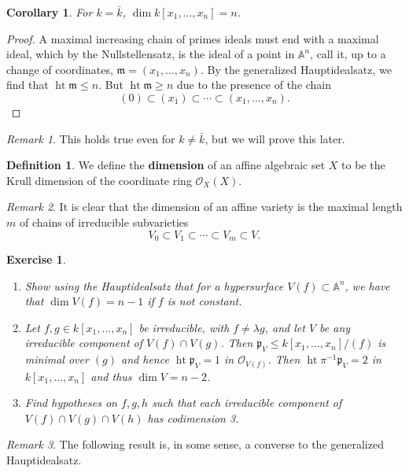 \documentclass{article}
\newcommand{\fr}{\mathfrak}
\newcommand{\A}{\mathbb{A}}
\DeclareMathOperator{\hgt}{ht}
\theoremstyle{plain}
\newtheorem{cor}[thm]{Corollary}
\newtheorem{exc}{Exercise}
\theoremstyle{definition}
\newtheorem{defn}{Definition}
\theoremstyle{remark}
\newtheorem*{rem}{Remark}
\begin{document}
\begin{cor}
    For $k=\bar k$, $\dim k[x_1,\ldots,x_n]=n$.
\end{cor}
\begin{proof}
    A maximal increasing chain of primes ideals must end with a maximal ideal, which
    by the Nullstellensatz, is the ideal of a point in $\A^n$, call it, up to a change of
    coordinates, $\fr m=(x_1,\ldots,x_n)$. By the generalized Hauptidealsatz, we find that
    $\hgt\fr m\leq n$. But $\hgt\fr m\geq n$ due to the presence of the chain
    \[(0)\subset (x_1)\subset \cdots\subset (x_1,\ldots,x_n).\]
\end{proof}

\begin{rem}
    This holds true even for $k\neq\bar k$, but we will prove this later.
\end{rem}

\begin{defn}
    We define the \textbf{dimension} of an affine algebraic set $X$ to be the Krull dimension
    of the coordinate ring $\mathcal{O}_X(X)$.
\end{defn}

\begin{rem}
    It is clear that the dimension of an affine variety is the maximal length $m$ of
    chains of irreducible subvarieties
    \[V_0\subset V_1\subset\cdots\subset V_m\subset V.\]
\end{rem}

\begin{exc}
    \begin{enumerate}
        \item Show using the Hauptidealsatz that for a hypersurface $V(f)\subset\A^n$,
            we have that $\dim V(f)=n-1$ if $f$ is not constant.
        \item Let $f,g\in k[x_1,\ldots,x_n]$ be irreducible, with $f\neq \lambda g$,
            and let $V$ be any irreducible component of $V(f)\cap V(g)$. Then
            $\fr p_V\leq k[x_1,\ldots,x_n]/(f)$ is minimal over $(g)$ and hence $\hgt\fr p_V=1$
            in $\mathcal{O}_{V(f)}$. Then $\hgt \pi^{-1}\fr p_V=2$ in $k[x_1,\ldots,x_n]$
            and thus $\dim V=n-2$.
        \item Find hypotheses on $f,g,h$ such that each irreducible component of $V(f)\cap V(g)\cap V(h)$
            has codimension 3.
    \end{enumerate}
\end{exc}

\begin{rem}
    The following result is, in some sense, a converse to the generalized Hauptidealsatz.
\end{rem}
\end{document}
